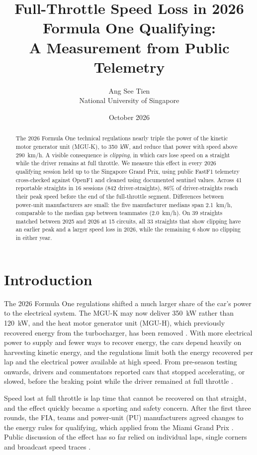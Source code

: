 \documentclass[11pt,a4paper]{article}
\title{Full-Throttle Speed Loss in 2026 Formula One Qualifying:\\
A Measurement from Public Telemetry}
\author{Ang See Tien\\National University of Singapore}
\date{October 2026}
\begin{document}
\maketitle

\begin{abstract}
The 2026 Formula One technical regulations nearly triple the power of the kinetic motor generator unit (MGU-K), to 350~kW, and reduce that power with speed above 290~km/h. A visible consequence is \emph{clipping}, in which cars lose speed on a straight while the driver remains at full throttle. We measure this effect in every 2026 qualifying session held up to the Singapore Grand Prix, using public FastF1 telemetry cross-checked against OpenF1 and cleaned using documented sentinel values. Across 41 reportable straights in 16 sessions (842 driver-straights), 86\% of driver-straights reach their peak speed before the end of the full-throttle segment. Differences between power-unit manufacturers are small: the five manufacturer medians span 2.1~km/h, comparable to the median gap between teammates (2.0~km/h). On 39 straights matched between 2025 and 2026 at 15 circuits, all 33 straights that show clipping have an earlier peak and a larger speed loss in 2026, while the remaining 6 show no clipping in either year.
\end{abstract}

\section{Introduction}

The 2026 Formula One regulations shifted a much larger share of the car's power to the electrical system. The MGU-K may now deliver 350~kW rather than 120~kW, and the heat motor generator unit (MGU-H), which previously recovered energy from the turbocharger, has been removed \citep{fia2026c, medland2026rules}. With more electrical power to supply and fewer ways to recover energy, the cars depend heavily on harvesting kinetic energy, and the regulations limit both the energy recovered per lap and the electrical power available at high speed. From pre-season testing onwards, drivers and commentators reported cars that stopped accelerating, or slowed, before the braking point while the driver remained at full throttle \citep{noble2026superclipping, noble2026leclerc, f1technical2026}.

Speed lost at full throttle is lap time that cannot be recovered on that straight, and the effect quickly became a sporting and safety concern. After the first three rounds, the FIA, teams and power-unit (PU) manufacturers agreed changes to the energy rules for qualifying, which applied from the Miami Grand Prix \citep{fia2026refinements}. Public discussion of the effect has so far relied on individual laps, single corners and broadcast speed traces \citep{noble2026leclerc, f1technical2026}.
\end{document}
